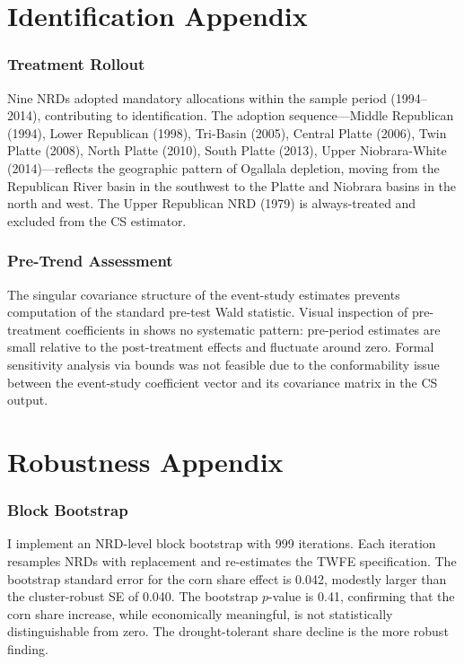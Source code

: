 \documentclass[12pt]{article}
\begin{document}
\section{Identification Appendix}

\subsubsection*{Treatment Rollout} Nine NRDs adopted mandatory allocations within the sample period (1994--2014), contributing to identification. The adoption sequence---Middle Republican (1994), Lower Republican (1998), Tri-Basin (2005), Central Platte (2006), Twin Platte (2008), North Platte (2010), South Platte (2013), Upper Niobrara-White (2014)---reflects the geographic pattern of Ogallala depletion, moving from the Republican River basin in the southwest to the Platte and Niobrara basins in the north and west. The Upper Republican NRD (1979) is always-treated and excluded from the CS estimator.

\subsubsection*{Pre-Trend Assessment} The singular covariance structure of the event-study estimates prevents computation of the standard pre-test Wald statistic. Visual inspection of pre-treatment coefficients in  shows no systematic pattern: pre-period estimates are small relative to the post-treatment effects and fluctuate around zero. Formal sensitivity analysis via \citet{rambachan2023more} bounds was not feasible due to the conformability issue between the event-study coefficient vector and its covariance matrix in the CS output.


\section{Robustness Appendix}

\subsubsection*{Block Bootstrap} I implement an NRD-level block bootstrap with 999 iterations. Each iteration resamples NRDs with replacement and re-estimates the TWFE specification. The bootstrap standard error for the corn share effect is 0.042, modestly larger than the cluster-robust SE of 0.040. The bootstrap $p$-value is 0.41, confirming that the corn share increase, while economically meaningful, is not statistically distinguishable from zero. The drought-tolerant share decline is the more robust finding.
\end{document}
